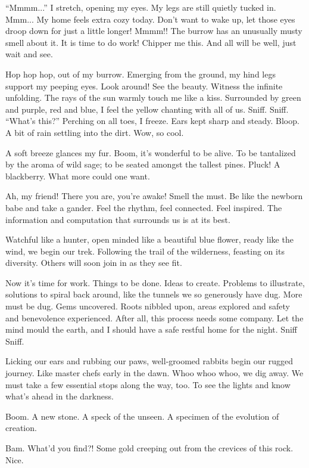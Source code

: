 ``Mmmm...'' I stretch, opening my eyes. My legs are still quietly tucked
in. Mmm... My home feels extra cozy today. Don't want to wake up, let
those eyes droop down for just a little longer! Mmmm!! The burrow has an
unusually musty smell about it. It is time to do work! Chipper me this.
And all will be well, just wait and see.

Hop hop hop, out of my burrow. Emerging from the ground, my hind legs
support my peeping eyes. Look around! See the beauty. Witness the
infinite unfolding. The rays of the sun warmly touch me like a kiss.
Surrounded by green and purple, red and blue, I feel the yellow chanting
with all of us. Sniff. Sniff. ``What's this?'' Perching on all toes, I
freeze. Ears kept sharp and steady. Bloop. A bit of rain settling into
the dirt. Wow, so cool.

A soft breeze glances my fur. Boom, it's wonderful to be alive. To be
tantalized by the aroma of wild sage; to be seated amongst the tallest
pines. Pluck! A blackberry. What more could one want.

Ah, my friend! There you are, you're awake! Smell the must. Be like the
newborn babe and take a gander. Feel the rhythm, feel connected. Feel
inspired. The information and computation that surrounds us is at its
best.

Watchful like a hunter, open minded like a beautiful blue flower, ready
like the wind, we begin our trek. Following the trail of the wilderness,
feasting on its diversity. Others will soon join in as they see fit.

Now it's time for work. Things to be done. Ideas to create. Problems to
illustrate, solutions to spiral back around, like the tunnels we so
generously have dug. More must be dug. Gems uncovered. Roots nibbled
upon, areas explored and safety and benevolence experienced. After all,
this process needs some company. Let the mind mould the earth, and I
should have a safe restful home for the night. Sniff Sniff.

Licking our ears and rubbing our paws, well-groomed rabbits begin our
rugged journey. Like master chefs early in the dawn. Whoo whoo whoo, we
dig away. We must take a few essential stops along the way, too. To see
the lights and know what's ahead in the darkness.

Boom. A new stone. A speck of the unseen. A specimen of the evolution of
creation.

Bam. What'd you find?! Some gold creeping out from the crevices of this
rock. Nice.

